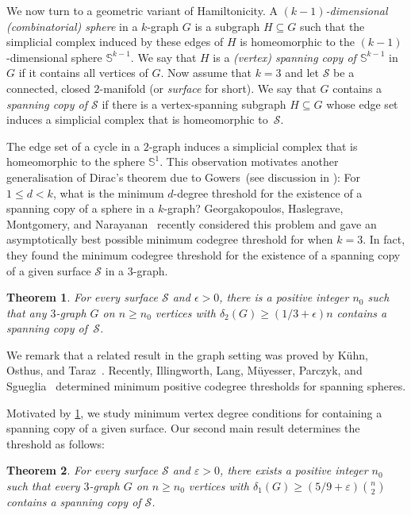 \documentclass[12pt,reqno]{amsart}
\theoremstyle{plain}
\newtheorem{theorem}{Theorem}[section]
\theoremstyle{definition}
\numberwithin{equation}{section}
\newcommand{\eps}{\varepsilon}
\newcommand{\cS}{\mathcal{S}}
\begin{document}
	We now turn to a geometric variant of Hamiltonicity.
	A \emph{$(k-1)$-dimensional (combinatorial) sphere} in a $k$-graph $G$ is a subgraph $H \subseteq G$ such that the simplicial complex induced by these edges of $H$ is homeomorphic to the $(k-1)$-dimensional sphere $\mathbb{S}^{k-1}$.
	We say that $H$ is a \emph{(vertex) spanning copy of $\mathbb{S}^{k-1}$} in $G$ if it contains all vertices of $G$. Now assume that $k=3$ and let $\cS$ be a connected, closed $2$-manifold (or \emph{surface} for short). We say that $G$ contains a \emph{spanning copy of $\cS$} if there is a vertex-spanning subgraph $H \subseteq G$ whose edge set induces a simplicial complex that is homeomorphic to~$\cS$.
	
	The edge set of a cycle in a $2$-graph induces a simplicial complex that is homeomorphic to the sphere $\mathbb{S}^1$. This observation motivates another generalisation of Dirac's theorem due to Gowers~(see discussion in \cite{Min2DegSS}): For $1 \leq d < k$, what is the minimum $d$-degree threshold for the existence of a spanning copy of a sphere in a $k$-graph?
	Georgakopoulos, Haslegrave, Montgomery, and Narayanan~\cite{Min2DegSS} recently considered this problem and gave an asymptotically best possible minimum codegree threshold for when $k=3$. In fact, they found the minimum codegree threshold for the existence of a spanning copy of a given surface $\cS$ in a $3$-graph.
	
	\begin{theorem}\label{t:min2degSpanningSurface}
		For every surface $\cS$ and $\epsilon > 0$, there is a positive integer $n_0$ such that any $3$-graph $G$ on $n \geq n_0$ vertices with $\delta_2(G) \geq (1/3+\epsilon)n$ contains a spanning copy of~$\cS$. 
	\end{theorem}
	
	We remark that a related result in the graph setting was proved by Kühn, Osthus, and Taraz~\cite{KOT05}.
	Recently, Illingworth, Lang, Müyesser, Parczyk, and Sgueglia~\cite{ILM+24} determined minimum positive codegree thresholds for spanning spheres.
	
	Motivated by \cref{t:min2degSpanningSurface}, we study minimum vertex degree conditions for containing a spanning copy of a given surface.
	Our second main result determines the threshold as follows:
	
	\begin{theorem}\label{thm:spanning-surface}
		For every surface $\cS$ and $\eps > 0$, there exists a positive integer $n_0$ such that every $3$-graph $G$ on $n \geq n_0$ vertices with $\delta_1(G) \geq (5/9 + \eps) \binom{n}{2}$ contains a spanning copy of $\cS$.
	\end{theorem}
	
\end{document}
